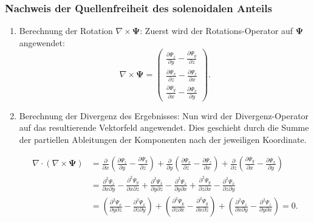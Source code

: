 \subsubsection{Nachweis der Quellenfreiheit des solenoidalen Anteils}

\begin{enumerate}
    \item Berechnung der Rotation $\nabla \times \mathbf{\Psi}$: Zuerst wird der Rotations-Operator auf $\mathbf{\Psi}$ angewendet:
    \[
    \nabla \times \mathbf{\Psi} =
    \begin{pmatrix}
        \frac{\partial \Psi_z}{\partial y} - \frac{\partial \Psi_y}{\partial z} \\
        \frac{\partial \Psi_x}{\partial z} - \frac{\partial \Psi_z}{\partial x} \\
        \frac{\partial \Psi_y}{\partial x} - \frac{\partial \Psi_x}{\partial y}
    \end{pmatrix}.
    \]

    \item Berechnung der Divergenz des Ergebnisses: Nun wird der Divergenz-Operator auf das resultierende Vektorfeld angewendet. Dies geschieht durch die Summe der partiellen Ableitungen der Komponenten nach der jeweiligen Koordinate.
    
    \begin{align*}
    \nabla \cdot (\nabla \times \mathbf{\Psi}) &= \frac{\partial}{\partial x}\left( \frac{\partial \Psi_z}{\partial y} - \frac{\partial \Psi_y}{\partial z} \right) + \frac{\partial}{\partial y}\left( \frac{\partial \Psi_x}{\partial z} - \frac{\partial \Psi_z}{\partial x} \right) + \frac{\partial}{\partial z}\left( \frac{\partial \Psi_y}{\partial x} - \frac{\partial \Psi_x}{\partial y} \right) \\[1em]
    &= \frac{\partial^2 \Psi_z}{\partial x \partial y} - \frac{\partial^2 \Psi_y}{\partial x \partial z} + \frac{\partial^2 \Psi_x}{\partial y \partial z} - \frac{\partial^2 \Psi_z}{\partial y \partial x} + \frac{\partial^2 \Psi_y}{\partial z \partial x} - \frac{\partial^2 \Psi_x}{\partial z \partial y} \\[1em]
    &= \left( \frac{\partial^2 \Psi_x}{\partial y \partial z} - \frac{\partial^2 \Psi_x}{\partial z \partial y} \right) + \left( \frac{\partial^2 \Psi_y}{\partial z \partial x} - \frac{\partial^2 \Psi_y}{\partial x \partial z} \right) + \left( \frac{\partial^2 \Psi_z}{\partial x \partial y} - \frac{\partial^2 \Psi_z}{\partial y \partial x} \right) = 0.
    \end{align*}
    

\end{enumerate}

